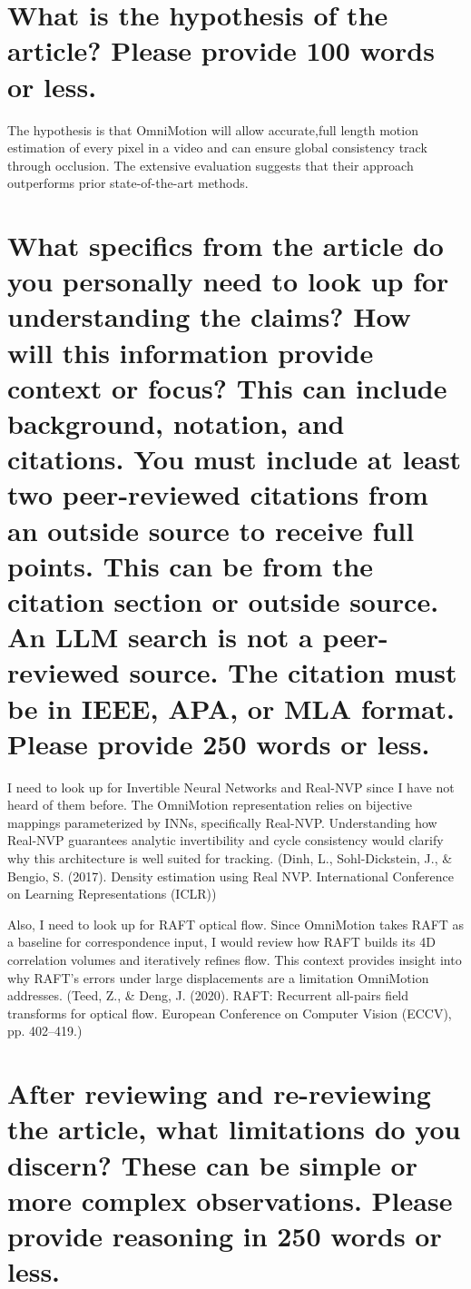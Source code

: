 \documentclass{article}
\begin{document}
\section{What is the hypothesis of the article? Please provide 100 words or less.
}

The hypothesis is that OmniMotion will allow accurate,full length motion estimation of every pixel in a video and can ensure global consistency track through occlusion. The extensive evaluation suggests that their approach outperforms prior state-of-the-art methods.

\section{What specifics from the article do you personally need to look up for understanding the claims? How will this information provide context or focus? This can include background, notation, and citations. You must include at least two peer-reviewed citations from an outside source to receive full points. This can be from the citation section or outside source. An LLM search is not a peer-reviewed source. The citation must be in IEEE, APA, or MLA format. Please provide 250 words or less.}

I need to look up for Invertible Neural Networks and Real-NVP since I have not heard of them before. The OmniMotion representation relies on bijective mappings parameterized by INNs, specifically Real-NVP. Understanding how Real-NVP guarantees analytic invertibility and cycle consistency would clarify why this architecture is well suited for tracking. (Dinh, L., Sohl-Dickstein, J., & Bengio, S. (2017). Density estimation using Real NVP. International Conference on Learning Representations (ICLR))

Also, I need to look up for RAFT optical flow. Since OmniMotion takes RAFT as a baseline for correspondence input, I would review how RAFT builds its 4D correlation volumes and iteratively refines flow. This context provides insight into why RAFT’s errors under large displacements are a limitation OmniMotion addresses. 
(Teed, Z., & Deng, J. (2020). RAFT: Recurrent all-pairs field transforms for optical flow. European Conference on Computer Vision (ECCV), pp. 402–419.)



\section{After reviewing and re-reviewing the article, what limitations do you discern? These can be simple or more complex observations. Please provide reasoning in 250 words or less. 
}
\end{document}
